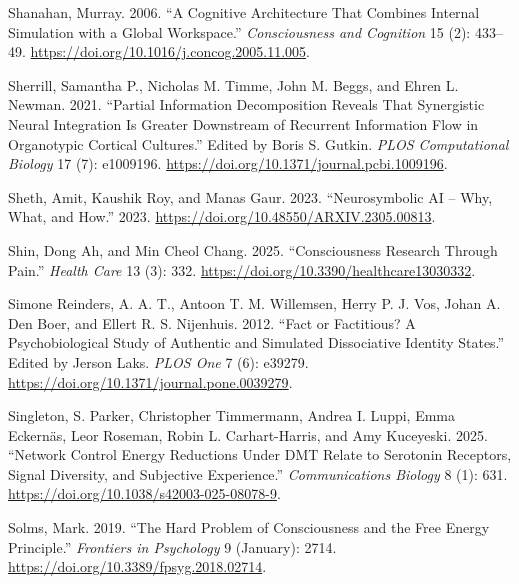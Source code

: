 \documentclass[
  a4paper]{article}
\newlength{\cslhangindent}
\newenvironment{CSLReferences}[2] %
 {\begin{list}{}{%
  \setlength{\itemindent}{0pt}
  \setlength{\leftmargin}{0pt}
  \setlength{\parsep}{0pt}
  \ifodd #1
   \setlength{\leftmargin}{\cslhangindent}
   \setlength{\itemindent}{-1\cslhangindent}
  \fi
  \setlength{\itemsep}{#2\baselineskip}}}
 {\end{list}}
\begin{document}
\begin{CSLReferences}{1}{0}
Shanahan, Murray. 2006. {``A Cognitive Architecture That Combines
Internal Simulation with a Global Workspace.''} \emph{Consciousness and
Cognition} 15 (2): 433--49.
\url{https://doi.org/10.1016/j.concog.2005.11.005}.

Sherrill, Samantha P., Nicholas M. Timme, John M. Beggs, and Ehren L.
Newman. 2021. {``Partial Information Decomposition Reveals That
Synergistic Neural Integration Is Greater Downstream of Recurrent
Information Flow in Organotypic Cortical Cultures.''} Edited by Boris S.
Gutkin. \emph{PLOS Computational Biology} 17 (7): e1009196.
\url{https://doi.org/10.1371/journal.pcbi.1009196}.

Sheth, Amit, Kaushik Roy, and Manas Gaur. 2023. {``Neurosymbolic {AI} --
Why, What, and How.''} 2023.
\url{https://doi.org/10.48550/ARXIV.2305.00813}.

Shin, Dong Ah, and Min Cheol Chang. 2025. {``Consciousness Research
Through Pain.''} \emph{Health Care} 13 (3): 332.
\url{https://doi.org/10.3390/healthcare13030332}.

Simone Reinders, A. A. T., Antoon T. M. Willemsen, Herry P. J. Vos,
Johan A. Den Boer, and Ellert R. S. Nijenhuis. 2012. {``Fact or
Factitious? {A} Psychobiological Study of Authentic and Simulated
Dissociative Identity States.''} Edited by Jerson Laks. \emph{PLOS One}
7 (6): e39279. \url{https://doi.org/10.1371/journal.pone.0039279}.

Singleton, S. Parker, Christopher Timmermann, Andrea I. Luppi, Emma
Eckernäs, Leor Roseman, Robin L. Carhart-Harris, and Amy Kuceyeski.
2025. {``Network Control Energy Reductions Under {DMT} Relate to
Serotonin Receptors, Signal Diversity, and Subjective Experience.''}
\emph{Communications Biology} 8 (1): 631.
\url{https://doi.org/10.1038/s42003-025-08078-9}.

Solms, Mark. 2019. {``The Hard Problem of Consciousness and the Free
Energy Principle.''} \emph{Frontiers in Psychology} 9 (January): 2714.
\url{https://doi.org/10.3389/fpsyg.2018.02714}.


\end{CSLReferences}
\end{document}
